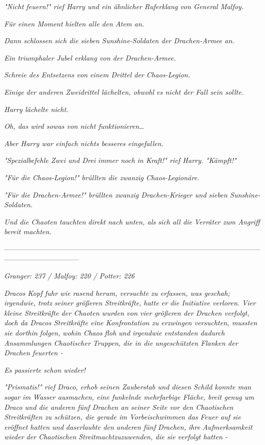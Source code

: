 {\emph{"Nicht feuern!" rief Harry und ein ähnlicher} \emph{Ruferklang} \emph{von General Malfoy.}

\emph{Für einen Moment} \emph{hielten alle den Atem an.}

\emph{Dann schlossen sich die sieben Sunshine-Soldaten der Drachen-Armee an.}

\emph{Ein triumphaler Jubel erklang von der Drachen-Armee.}

\emph{Schreie des Entsetzens von} \emph{einem Drittel der} \emph{Chaos-Legion.}

\emph{Einige} \emph{der anderen Zweidrittel lächelten, obwohl} \emph{es nicht der Fall sein sollte.}

\emph{Harry lächelte nicht.}

\emph{\emph{Oh, das wird sowas von nicht funktionieren…}}

\emph{Aber Harry war einfach nichts besseres eingefallen.}

\emph{"Spezialbefehle Zwei und Drei} \emph{immer noch} \emph{in Kraft!" rief Harry. "Kämpft!"}

\emph{"\emph{Für die Chaos-Legion!}" brüllten die zwanzig Chaos-Legionäre.}

\emph{"\emph{Für die Drachen-Armee!}" brüllten zwanzig Drachen-Krieger und sieben Sunshine-Soldaten.}

\emph{Und die Chaoten tauchten} \emph{direkt} \emph{nach unten, als} \emph{sich all die} \emph{Verräter zum Angriff bereit machten.}

--------------------------------------------------------------------------------------------------------------------------------------------

\emph{Granger: 237 / Malfoy: 220 / Potter: 226}

\emph{Dracos Kopf fuhr wie rasend herum, versuchte} \emph{zu erfassen, was geschah; irgendwie, trotz seiner größeren Streitkräfte,} \emph{hatte er} \emph{\emph{die Initiative verloren.}} \emph{Vier kleine Streitkräfte der Chaoten wurden von vier größeren der Drachen verfolgt,} \emph{doch} \emph{da Dracos Streitkräfte eine Konfrontation zu erzwingen versuchten, mussten sie dorthin} \emph{\emph{folgen,}} \emph{wohin Chaos} \emph{\emph{floh}} \emph{und irgendwie entstanden dadurch} \emph{Ansammlungen} \emph{Chaotischer} \emph{Truppen, die in die ungeschützten Flanken der Drachen feuerten -}

\emph{Es passierte} \emph{\emph{schon wieder!}}

\emph{"\emph{Prismatis!}" rief Draco,} \emph{erhob seinen Zauberstab und diesen Schild konnte man sogar} \emph{im} \emph{Wasser ausmachen, eine funkelnde mehrfarbige Fläche, breit genug um Draco und die anderen fünf Drachen an seiner Seite vor den Chaotischen Streitkräften zu schützen, die gerade im Vorbeischwimmen das Feuer auf sie eröffnet hatten und} \emph{\emph{das}erlaubte den} \emph{anderen fünf} \emph{Drachen,} \emph{\emph{ihre}} \emph{Aufmerksamkeit} \emph{wieder} \emph{der} \emph{Chaotischen} \emph{Streitmachtzuzuwenden, die sie verfolgt hatten -}

}
